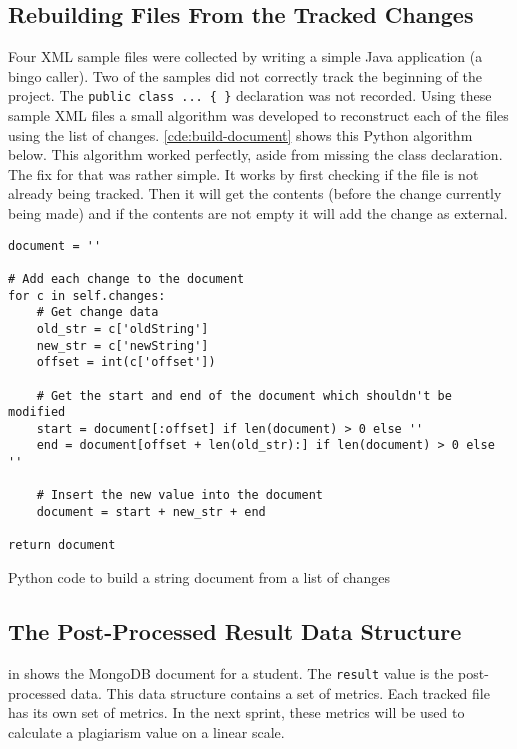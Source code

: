 \subsection{Rebuilding Files From the Tracked Changes}
Four XML sample files were collected by writing a simple Java application (a bingo caller). Two of the samples did not correctly track the beginning of the project. The \texttt{public class ... \{ \}} declaration was not recorded. Using these sample XML files a small algorithm was developed to reconstruct each of the files using the list of changes. \autoref{cde:build-document} shows this Python algorithm below. This algorithm worked perfectly, aside from missing the class declaration. The fix for that was rather simple. It works by first checking if the file is not already being tracked. Then it will get the contents (before the change currently being made) and if the contents are not empty it will add the change as external.

\begin{code}
\begin{verbatim}
document = ''

# Add each change to the document
for c in self.changes:
    # Get change data
    old_str = c['oldString']
    new_str = c['newString']
    offset = int(c['offset'])

    # Get the start and end of the document which shouldn't be modified
    start = document[:offset] if len(document) > 0 else ''
    end = document[offset + len(old_str):] if len(document) > 0 else ''

    # Insert the new value into the document
    document = start + new_str + end

return document
\end{verbatim}
\caption{Python code to build a string document from a list of changes}
\label{cde:build-document}
\end{code}

\subsection{The Post-Processed Result Data Structure}
 in  shows the MongoDB document for a student. The \texttt{result} value is the post-processed data. This data structure contains a set of metrics. Each tracked file has its own set of metrics. In the next sprint, these metrics will be used to calculate a plagiarism value on a linear scale.

